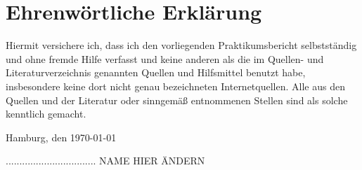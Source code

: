 \section*{Ehrenwörtliche Erklärung}

Hiermit versichere ich, dass ich den vorliegenden Praktikumsbericht selbstständig und ohne fremde Hilfe verfasst und keine anderen als die im Quellen- und Literaturverzeichnis genannten Quellen und Hilfsmittel benutzt habe, insbesondere keine dort nicht genau bezeichneten Internetquellen. Alle aus den Quellen und der Literatur oder sinngemäß entnommenen Stellen sind als solche kenntlich gemacht.
\newline

Hamburg, den {\today}
\vspace*{1.0cm}

.................................
\newline
NAME HIER ÄNDERN